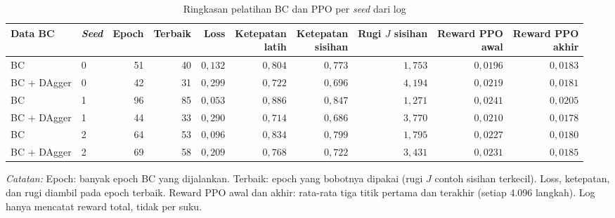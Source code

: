 \begin{table}[htbp]
\caption{Ringkasan pelatihan BC dan PPO per \emph{seed} dari log}
\label{tab:latih-log}
\centering\footnotesize
\setlength{\tabcolsep}{4pt}
\begin{adjustbox}{max width=\textwidth}
\begin{tabular}{llrrrrrrrr}
\toprule
Data BC & \emph{Seed} & Epoch & Terbaik & Loss & \shortstack[r]{Ketepatan\\latih} & \shortstack[r]{Ketepatan\\sisihan} & \shortstack[r]{Rugi $J$\\sisihan} & \shortstack[r]{Reward PPO\\awal} & \shortstack[r]{Reward PPO\\akhir} \\
\midrule
BC & 0 & 51 & 40 & $0{,}132$ & $0{,}804$ & $0{,}773$ & $1{,}753$ & $0{,}0196$ & $0{,}0183$ \\
BC + DAgger & 0 & 42 & 31 & $0{,}299$ & $0{,}722$ & $0{,}696$ & $4{,}194$ & $0{,}0219$ & $0{,}0181$ \\
BC & 1 & 96 & 85 & $0{,}053$ & $0{,}886$ & $0{,}847$ & $1{,}271$ & $0{,}0241$ & $0{,}0205$ \\
BC + DAgger & 1 & 44 & 33 & $0{,}290$ & $0{,}714$ & $0{,}686$ & $3{,}770$ & $0{,}0210$ & $0{,}0178$ \\
BC & 2 & 64 & 53 & $0{,}096$ & $0{,}834$ & $0{,}799$ & $1{,}795$ & $0{,}0227$ & $0{,}0180$ \\
BC + DAgger & 2 & 69 & 58 & $0{,}209$ & $0{,}768$ & $0{,}722$ & $3{,}431$ & $0{,}0231$ & $0{,}0185$ \\
\bottomrule
\end{tabular}
\end{adjustbox}
\par\smallskip\footnotesize\textit{Catatan:} Epoch: banyak epoch BC yang dijalankan. Terbaik: epoch yang bobotnya dipakai (rugi $J$ contoh sisihan terkecil). Loss, ketepatan, dan rugi diambil pada epoch terbaik. Reward PPO awal dan akhir: rata-rata tiga titik pertama dan terakhir (setiap 4.096 langkah). Log hanya mencatat reward total, tidak per suku.
\end{table}
